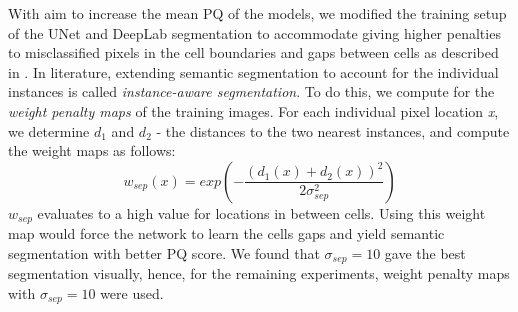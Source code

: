\documentclass[10pt, journal, compsoc]{IEEEtran}
\begin{document}
With aim to increase the mean PQ of the models, we modified the training setup of the UNet and DeepLab segmentation to accommodate giving higher penalties to misclassified pixels in the cell boundaries and gaps between cells as described in \cite{nature_unet}. In literature, extending semantic segmentation to account for the individual instances is called \textit{instance-aware segmentation}. To do this, we compute for the \textit{weight penalty maps} of the training images.
For each individual pixel location \textit{x}, we determine \textit{$d_1$} and \textit{$d_2$} - the distances to the two nearest instances, and compute the weight maps as follows:
\begin{equation}
w_{sep}(x) = exp\left({-\frac{(d_1(x) + d_2(x))^2}{2\sigma^2_{sep}}}\right)
\end{equation}
$w_{sep}$ evaluates to a high value for locations in between  cells. Using this weight map would force the network to learn the cells gaps and yield semantic segmentation with better PQ score. We found that $\sigma_{sep} = 10$ gave the best segmentation visually, hence, for the remaining experiments, weight penalty maps with $\sigma_{sep} = 10$ were used. 
\end{document}
